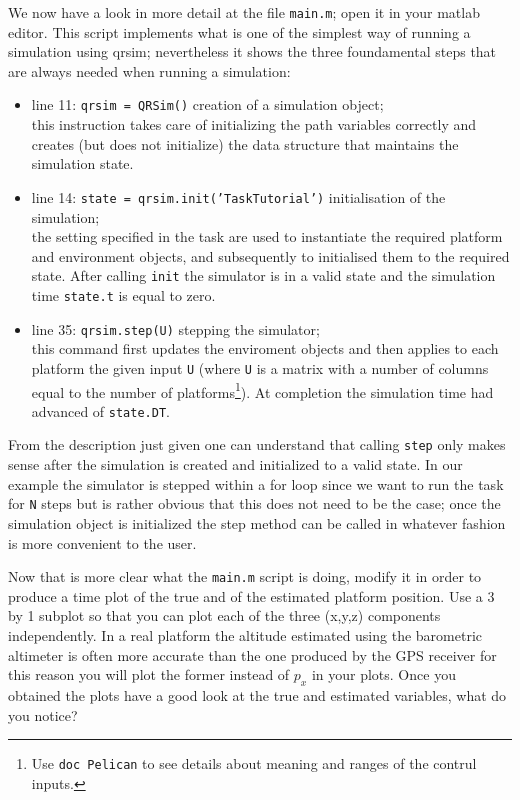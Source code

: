 \documentclass[a4paper,11pt]{article}
\begin{document}
We now have a look in more detail at the file \texttt{main.m}; open it in your matlab editor. 
This script implements what is one of the simplest way of running a simulation using qrsim; nevertheless it shows the three foundamental steps that are always needed when running a simulation:
\begin{itemize}
 \item line 11: \texttt{qrsim = QRSim()}  creation of a simulation object; \\
  this instruction takes care of initializing the path variables correctly and creates (but does not initialize) the data structure that maintains the simulation state. 
 \item line 14: \texttt{state = qrsim.init('TaskTutorial')} initialisation of the simulation;\\
  the setting specified in the task are used to instantiate the required platform and environment objects, and subsequently to initialised them to the required state. After calling \texttt{init} the simulator is in a valid state and the simulation time \texttt{state.t} is equal to zero.
 \item line 35: \texttt{qrsim.step(U)} stepping the simulator;\\
  this command first updates the enviroment objects and then applies to each platform the given input \texttt{U} (where \texttt{U} is a matrix with a number of columns equal to the number of platforms\footnote{Use \texttt{doc Pelican} to see details about meaning and ranges of the contrul inputs.}). At completion the simulation time had advanced of \texttt{state.DT}.  
\end{itemize}
From the description just given one can understand that calling \texttt{step} only makes sense after the simulation is created and initialized to a valid state. 
In our example the simulator is stepped within a for loop since we want to run the task for \texttt{N} steps but is rather obvious that this does not need to be the case; once the simulation object is initialized the step method can be called in whatever fashion is more convenient to the user.

Now that is more clear what the \texttt{main.m} script is doing, modify it in order to produce a time plot of the true and of the estimated platform position. Use a 3 by 1 subplot so that you can plot each of the three (x,y,z) components independently.   
In a real platform the altitude estimated using the barometric altimeter is often more accurate than the one produced by the GPS receiver for this reason you will plot the former instead of $p_x$ in your plots.
Once you obtained the plots have a good look at the true and estimated variables, what do you notice?
\end{document}
